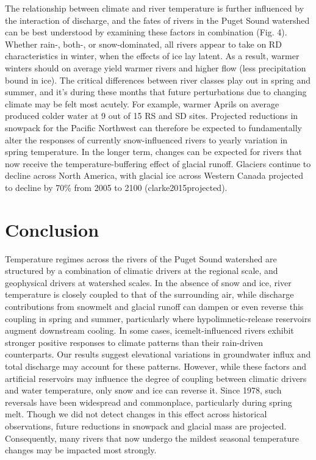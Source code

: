 The relationship between climate and river temperature is further influenced by the interaction of discharge, and the fates of rivers in the Puget Sound watershed can be best understood by examining these factors in combination (Fig. 4). Whether rain-, both-, or snow-dominated, all rivers appear to take on RD characteristics in winter, when the effects of ice lay latent. As a result, warmer winters should on average yield warmer rivers and higher flow (less precipitation bound in ice). The critical differences between river classes play out in spring and summer, and it's during these months that future perturbations due to changing climate may be felt most acutely. For example, warmer Aprils on average produced colder water at 9 out of 15 RS and SD sites. Projected reductions in snowpack for the Pacific Northwest can therefore be expected to fundamentally alter the responses of currently snow-influenced rivers to yearly variation in spring temperature. In the longer term, changes can be expected for rivers that now receive the temperature-buffering effect of glacial runoff. Glaciers continue to decline across North America, with glacial ice across Western Canada projected to decline by 70\% from 2005 to 2100 (clarke2015projected).

\section*{Conclusion}

Temperature regimes across the rivers of the Puget Sound watershed are structured by a combination of climatic drivers at the regional scale, and geophysical drivers at watershed scales. In the absence of snow and ice, river temperature is closely coupled to that of the surrounding air, while discharge contributions from snowmelt and glacial runoff can dampen or even reverse this coupling in spring and summer, particularly where hypolimnetic-release reservoirs augment downstream cooling. In some cases, icemelt-influenced rivers exhibit stronger positive responses to climate patterns than their rain-driven counterparts. Our results suggest elevational variations in groundwater influx and total discharge may account for these patterns. However, while these factors and artificial reservoirs may influence the degree of coupling between climatic drivers and water temperature, only snow and ice can reverse it. Since 1978, such reversals have been widespread and commonplace, particularly during spring melt. Though we did not detect changes in this effect across historical observations, future reductions in snowpack and glacial mass are projected. Consequently, many rivers that now undergo the mildest seasonal temperature changes may be impacted most strongly.
\clearpage

